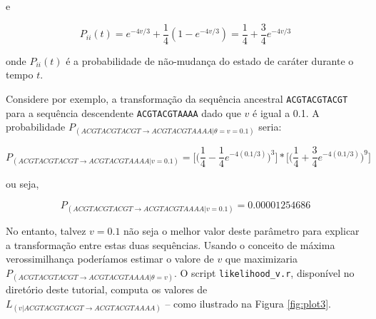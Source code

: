 \begin{refsection}
e

\begin{center}
\begin{equation}
P_{ii}(t) =  e^{-4v/3}+\frac{1}{4}(1-e^{-4v/3}) = \frac{1}{4}+\frac{3}{4}e^{-4v/3}
\end{equation}
\end{center}


onde $P_{ii}(t)$ é a probabilidade de não-mudança do estado de caráter durante o tempo $t$.


Considere por exemplo, a transformação da sequência ancestral \texttt{ACGTACGTACGT} para a sequência descendente \texttt{ACGTACGTAAAA} dado que $v$ é igual a 0.1. A probabilidade $P_{(ACGTACGTACGT \rightarrow ACGTACGTAAAA|\theta = v = 0.1)}$ seria:

\begin{center}
\begin{equation}
P_{(ACGTACGTACGT \rightarrow ACGTACGTAAAA|v = 0.1)} =  \bigg[\Big(\frac{1}{4}-\frac{1}{4}e^{-4(0.1/3)}\Big)^3\bigg]*\bigg[\Big(\frac{1}{4}+\frac{3}{4}e^{-4(0.1/3)}\Big)^9\bigg]
\end{equation}
\end{center}

ou seja,


\begin{center}
\begin{equation}
P_{(ACGTACGTACGT \rightarrow ACGTACGTAAAA|v = 0.1)} =  0.00001254686
\end{equation}
\end{center}

No entanto, talvez $v=0.1$ não seja o melhor valor deste parâmetro para explicar a transformação entre estas duas sequências. Usando o conceito de máxima verossimilhança poderíamos estimar o valore de $v$ que maximizaria $P_{(ACGTACGTACGT \rightarrow ACGTACGTAAAA|\theta = v)}$. O script \texttt{likelihood\_v.r}, disponível no diretório deste tutorial, computa os valores de $L_{(v|ACGTACGTACGT \rightarrow ACGTACGTAAAA)}$ -- como ilustrado na Figura \ref{fig:plot3}.


\end{refsection}
